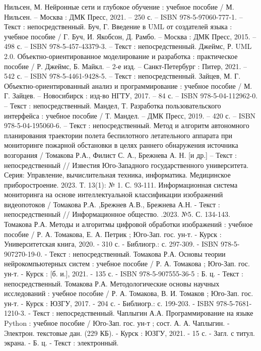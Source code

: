 \begin{thebibliography}{50}
     Нильсен, М. Нейронные сети и глубокое обучение : учебное пособие / М. Нильсен. – Москва : ДМК Пресс, 2021. – 250 с. – ISBN 978-5-97060-777-1. – Текст : непосредственный.
     Буч, Г. Введение в UML от создателей языка : учебное пособие / Г. Буч, И. Якобсон, Д. Рамбо. – Москва : ДМК Пресс, 2015. – 498 с. – ISBN 978-5-457-43379-3. – Текст : непосредственный.
     Джеймс, Р. UML 2.0. Объектно-ориентированное моделирование и разработка : практическое пособие / Р. Джеймс, Б. Майкл. – 2-е изд. – Санкт-Петербург : Питер, 2021. – 542 с. – ISBN 978-5-4461-9428-5. – Текст : непосредственный.
     Зайцев, М. Г. Объектно-ориентированный анализ и программирование : учебное пособие / М. Г. Зайцев. – Новосибирск : изд-во НГТУ, 2017. – 84 с. – ISBN 978-5-04-112962-0. – Текст : непосредственный.
     Мандел, Т. Разработка пользовательского интерфейса : учебное пособие / Т. Мандел. – ДМК Пресс, 2019. – 420 с. – ISBN 978-5-04-195060-6. – Текст : непосредственный.
     Метод и алгоритм автономного планирования траектории полета беспилотного летательного аппарата при мониторинге пожарной обстановки в целях раннего обнаружения источника возгорания / Томакова Р.А., Филист С. А., Брежнева А. Н. [и др.] – Текст : непосредственный // Известия Юго-Западного государственного университета. Серия: Управление, вычислительная техника, информатика. Медицинское приборостроение. 2023. Т. 13(1): № 1. С. 93-111.
     Информационная система мониторинга на основе интеллектуальной классификации изображений видеопотоков / Томакова Р.А. ,Брежнев А.В., Брежнева А.Н. -  Текст : непосредственный // Информационное общество. .2023. №5. С. 134-143.
     Томакова Р.А.  Методы и алгоритмы цифровой обработки изображений : учебное пособие / Р. А. Томакова, Е. А. Петрик ; Юго-Зап. гос. ун-т. - Курск : Университетская книга, 2020. - 310 с. - Библиогр.: с. 297-309. - ISBN 978-5-907270-19-0. - Текст : непосредственный.
     Томакова Р.А.  Основы теории нейрокомпьютерных систем : учебное пособие / Р. А. Томакова ; Юго-Зап. гос. ун-т. - Курск : [б. и.], 2021. - 135 с. - ISBN 978-5-907555-36-5 : Б. ц. - Текст : непосредственный.
     Томакова Р.А.  Методологические основы научных исследований : учебное пособие / Р. А. Томакова, В. И. Томаков ; Юго-Зап. гос. ун-т. - Курск : ЮЗГУ, 2017. - 204 с. - Библиогр.: с. 199-203. - ISBN 978-5-7681-1210-3. - Текст : непосредственный.
     Чаплыгин А.А. Программирование на языке Python : учебное пособие / Юго-Зап. гос. ун-т ; сост. А. А. Чаплыгин. - Электрон. текстовые дан. (229 КБ). - Курск : ЮЗГУ, 2021. - 15 с. - Загл. с титул. экрана. - Б. ц. - Текст : электронный.

\end{thebibliography}
